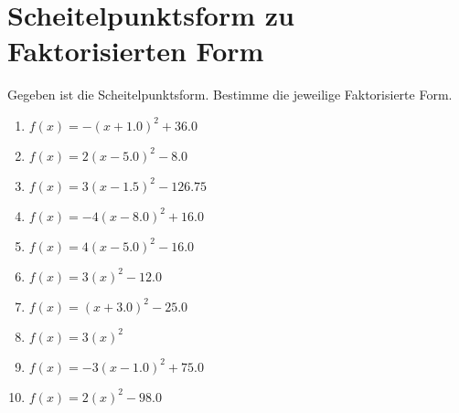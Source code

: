 \documentclass{article}%
\begin{document}
\section{Scheitelpunktsform zu Faktorisierten Form}%
\label{sec:ScheitelpunktsformzuFaktorisiertenForm}%
Gegeben ist die Scheitelpunktsform. Bestimme die jeweilige Faktorisierte Form.%
\begin{enumerate}[label=\alph*)]%
\item%
\newline\vspace{0.5cm} $f(x)=-(x+1.0)^2 +36.0$%
\item%
\newline\vspace{0.5cm} $f(x)=2(x-5.0)^2 -8.0$%
\item%
\newline\vspace{0.5cm} $f(x)=3(x-1.5)^2 -126.75$%
\item%
\newline\vspace{0.5cm} $f(x)=-4(x-8.0)^2 +16.0$%
\item%
\newline\vspace{0.5cm} $f(x)=4(x-5.0)^2 -16.0$%
\item%
\newline\vspace{0.5cm} $f(x)=3(x)^2 -12.0$%
\item%
\newline\vspace{0.5cm} $f(x)=(x+3.0)^2 -25.0$%
\item%
\newline\vspace{0.5cm} $f(x)=3(x)^2$%
\item%
\newline\vspace{0.5cm} $f(x)=-3(x-1.0)^2 +75.0$%
\item%
\newline\vspace{0.5cm} $f(x)=2(x)^2 -98.0$%
\end{enumerate}

%
\end{document}
